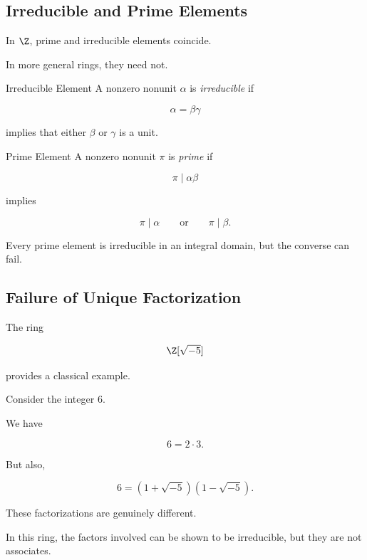 \subsection{Irreducible and Prime Elements}
\label{subsec:irreducible-prime-elements}

In \(\Z\), prime and irreducible elements coincide.

In more general rings, they need not.

\begin{definitionbox}{Irreducible Element}
A nonzero nonunit \(\alpha\) is \emph{irreducible} if

\[ \alpha=\beta\gamma \]

implies that either \(\beta\) or \(\gamma\) is a unit.
\end{definitionbox}

\begin{definitionbox}{Prime Element}
A nonzero nonunit \(\pi\) is \emph{prime} if

\[ \pi\mid\alpha\beta \]

implies

\[ \pi\mid\alpha\qquad\text{or}\qquad\pi\mid\beta. \]
\end{definitionbox}

Every prime element is irreducible in an integral domain, but the converse
can fail.

\subsection{Failure of Unique Factorization}
\label{subsec:failure-unique-factorization}

The ring

\[ \Z[\sqrt{-5}] \]

provides a classical example.

Consider the integer \(6\).

We have

\[ 6=2\cdot3. \]

But also,

\[ 6=(1+\sqrt{-5})(1-\sqrt{-5}). \]

These factorizations are genuinely different.

In this ring, the factors involved can be shown to be irreducible, but they
are not associates.

